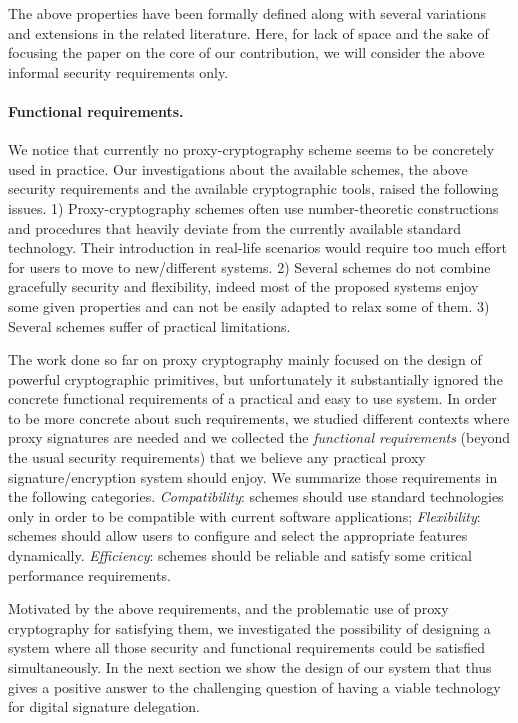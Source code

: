 \documentclass[runningheads]{llncs}
\begin{document}
The above properties have been formally defined along with several variations and extensions in the related literature. Here, for lack of space and the sake of focusing the paper on the core of our contribution, we will consider the above informal security requirements only.

\paragraph{Functional requirements.}
We notice that currently no proxy-cryptography scheme seems to be concretely used in practice. Our investigations about the available schemes, the above security requirements and the available cryptographic tools, raised the following issues. 1) Proxy-cryptography schemes often use number-theoretic constructions and procedures that heavily deviate from the currently available standard technology. Their introduction in real-life scenarios would require too much effort for users to move to new/different systems. 2) Several schemes do not combine gracefully security and flexibility, indeed most of the proposed systems enjoy some given properties and can not be easily adapted to relax some of them. 3) Several schemes suffer of practical limitations.

The work done so far on proxy cryptography mainly focused on the design of powerful cryptographic primitives, but unfortunately it substantially ignored the concrete functional requirements of a practical and easy to use system. In order to be more concrete about such requirements, we studied different contexts where proxy signatures are needed and we collected the \emph{functional requirements} (beyond the usual security requirements) that we believe any practical proxy signature/encryption system should enjoy. We summarize those requirements in the following categories.
{\em Compatibility}: schemes should use standard technologies only in order to be compatible with current software applications;
{\em Flexibility}: schemes should allow users to configure and select the appropriate features dynamically.
{\em Efficiency}: schemes should be reliable and satisfy some critical performance requirements.

Motivated by the above requirements, and the problematic use of proxy cryptography for satisfying them, we investigated the possibility of designing a system where all those security and functional requirements could be satisfied simultaneously. In the next section we show the design of our system that thus gives a positive answer to the challenging question of having a viable technology for digital signature delegation.
\end{document}
